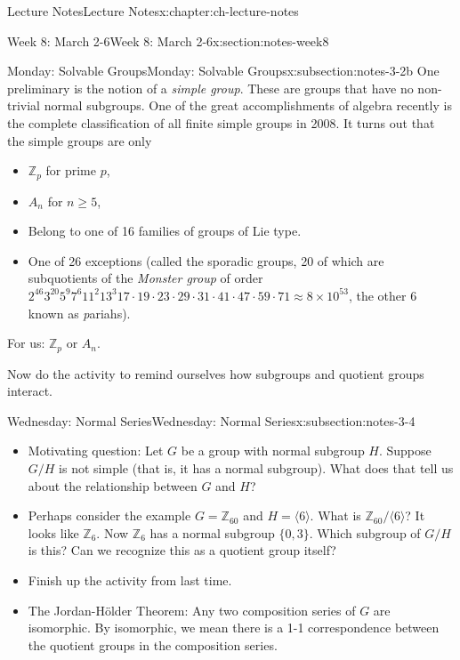 \documentclass[oneside,11pt,]{book}
\begin{document}
\begin{chapterptx}{Lecture Notes}{}{Lecture Notes}{}{}{x:chapter:ch-lecture-notes}
\begin{sectionptx}{Week 8: March 2-6}{}{Week 8: March 2-6}{}{}{x:section:notes-week8}
\begin{subsectionptx}{Monday: Solvable Groups}{}{Monday: Solvable Groups}{}{}{x:subsection:notes-3-2b}
One preliminary is the notion of a \emph{simple group}. These are groups that have no non-trivial normal subgroups. One of the great accomplishments of algebra recently is the complete classification of all finite simple groups in 2008. It turns out that the simple groups are only%
\par
%
\begin{itemize}[label=\textbullet]
\item{}\(\mathbb Z_p\) for prime \(p\),%
\item{}\(A_n\) for \(n \ge 5\),%
\item{}Belong to one of 16 families of groups of Lie type.%
\item{}One of 26 exceptions (called the sporadic groups, 20 of which are subquotients of the \emph{Monster group} of order \(2^{46} 3^{20}5^9 7^6 11^2 13^3 17 \cdot 19 \cdot 23 \cdot 29 \cdot 31 \cdot 41 \cdot 47 \cdot 59 \cdot 71 \approx 8\times 10^{53}\), the other 6 known as \emph{p}ariahs).%
\end{itemize}
%
\par
For us: \(\mathbb Z_p\) or \(A_n\).%
\par
Now do the activity to remind ourselves how subgroups and quotient groups interact.%
\end{subsectionptx}
%
%
\typeout{************************************************}
\typeout{************************************************}
%
\begin{subsectionptx}{Wednesday: Normal Series}{}{Wednesday: Normal Series}{}{}{x:subsection:notes-3-4}
%
\begin{itemize}[label=\textbullet]
\item{}Motivating question: Let \(G\) be a group with normal subgroup \(H\). Suppose \(G/H\) is not simple (that is, it has a normal subgroup). What does that tell us about the relationship between \(G\) and \(H\)?%
\item{}Perhaps consider the example \(G = \mathbb Z_{60}\) and \(H = \langle 6\rangle\). What is \(\mathbb Z_{60}/\langle 6\rangle\)? It looks like \(\mathbb Z_{6}\). Now \(\mathbb Z_{6}\) has a normal subgroup \(\{0, 3\}\). Which subgroup of \(G/H\) is this? Can we recognize this as a quotient group itself?%
\item{}Finish up the activity from last time.%
\item{}The Jordan-Hölder Theorem: Any two composition series of \(G\) are isomorphic. By isomorphic, we mean there is a 1-1 correspondence between the quotient groups in the composition series.%

\end{itemize}
\end{subsectionptx}
\end{sectionptx}
\end{chapterptx}
\end{document}
